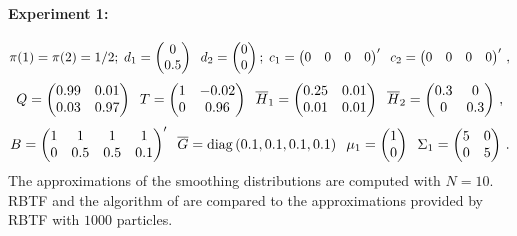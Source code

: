 \paragraph{Experiment 1:}
\[
\pi(1)=\pi(2) = 1/2\\;\;d_1 = \begin{pmatrix}0 \\ 0.5 \end{pmatrix}\;\; d_2 = \begin{pmatrix}0 \\ 0\end{pmatrix}\\;\;c_1= \begin{pmatrix}0 & 0& 0 & 0 \end{pmatrix}'\;\;c_2 =\begin{pmatrix}0 & 0 & 0 & 0 \end{pmatrix}'\,,
\]
\[
Q = \begin{pmatrix}0.99 & 0.01\\ 0.03 & 0.97\end{pmatrix}\;\;T = \begin{pmatrix}1 & -0.02\\ 0 & 0.96\end{pmatrix}\;\;\overline{H}_1 = \begin{pmatrix}0.25 & 0.01\\ 0.01 & 0.01\end{pmatrix}\;\;\overline{H}_2 = \begin{pmatrix}0.3 & 0\\ 0 & 0.3\end{pmatrix}\,,
\]
\[
B = \begin{pmatrix}1 & 1 & 1 & 1\\ 0 & 0.5 & 0.5 & 0.1 \end{pmatrix}'\;\; \overline{G} = \mathrm{diag}\left(0.1,0.1,0.1,0.1\right)\;\; \mu_1 = \begin{pmatrix}1 \\ 0\end{pmatrix}\;\; \Sigma_1 = \begin{pmatrix} 5 & 0 \\ 0  & 5\end{pmatrix}\,.
\]
The approximations of the smoothing distributions are computed with $N=10$. RBTF and the algorithm of \cite{briers:doucet:maskell:2010} are compared to the approximations provided by RBTF with $1000$ particles.

